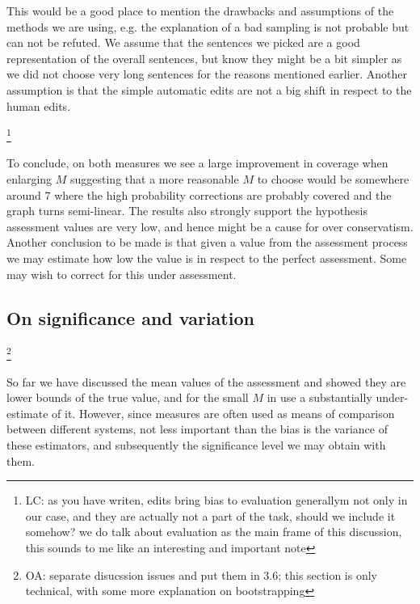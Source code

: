 \documentclass[letter,11pt]{article}
\newcommand{\com}[1]{}
\newcommand{\oa}[1]{\footnote{\color{red}OA: #1}}
\newcommand{\lc}[1]{\footnote{\color{green}LC: #1}}
\begin{document}
		This would be a good place to mention the drawbacks and assumptions of the methods we are using, e.g. the explanation of a bad sampling is not probable but can not be refuted. We assume that the sentences we picked are a good representation of the overall sentences, but know they might be a bit simpler as we did not choose very long sentences for the reasons mentioned earlier. Another assumption is that the simple automatic edits are not a big shift in respect to the human edits.
		
		\com{This may result by the mechanical creation of edits. The different edits might give bias to the results\oa{but this is also true when evaluating real systems, no?}. Edit borders are not part of what correctors need to extract, in other words, it is an information that is not inherent to the task. Those edits are a disadvantage of the scoring system itself. It makes crowdsourcing much harder, and the edits are yet another thing that annotations often disagree upon(\cite{dahlmeier2012better}). It might be another reason that calls for use of another, more interpretable score.}
		\lc{as you have writen, edits bring bias to evaluation generallym not only in our case, and they are actually not a part of the task, should we include it somehow? we do talk about evaluation as the main frame of this discussion, this sounds to me like an interesting and important note}
		
		To conclude, on both measures we see a large improvement in coverage when enlarging $M$ suggesting that a more reasonable $M$ to choose would be somewhere around 7 where the high probability corrections are probably covered and the graph turns semi-linear. The results also strongly support the hypothesis assessment values are very low, and hence might be a cause for over conservatism.
		Another conclusion to be made is that given a value from the assessment process we may estimate how low the value is in respect to the perfect assessment. Some may wish to correct for this under assessment.
		
		\subsection{On significance and variation}
		
		\oa{separate disucssion issues and put them in 3.6; this section is only
			technical, with some more explanation on bootstrapping}
		
		
		So far we have discussed the mean values of the assessment and showed they are lower bounds of the true value, and for the small $M$ in use a substantially under-estimate of it. However, since measures are often used as means of comparison between different systems, not less important than the bias is the variance of these estimators, and subsequently the significance level we may obtain with them. 
		
\end{document}
